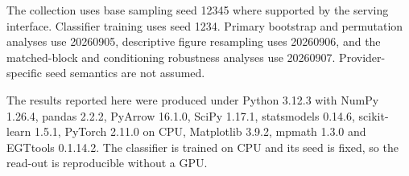 \documentclass[openacc]{rsproca_new}
\begin{document}
The collection uses base sampling seed 12345 where supported by the serving
interface. Classifier training uses seed 1234. Primary bootstrap and permutation
analyses use 20260905, descriptive figure resampling uses 20260906, and the
matched-block and conditioning robustness analyses use 20260907. Provider-specific
seed semantics are not assumed.

The results reported here were produced under Python 3.12.3 with NumPy 1.26.4,
pandas 2.2.2, PyArrow 16.1.0, SciPy 1.17.1, statsmodels 0.14.6,
scikit-learn 1.5.1, PyTorch 2.11.0 on CPU, Matplotlib 3.9.2, mpmath 1.3.0 and
EGTtools 0.1.14.2. The classifier is trained on CPU and its seed is fixed, so
the read-out is reproducible without a GPU.


\printbibliography
\end{document}
